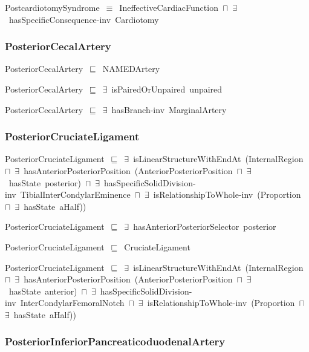 \documentclass{article}
\begin{document}
PostcardiotomySyndrome~\ensuremath{\equiv}~IneffectiveCardiacFunction~\ensuremath{\sqcap}~\ensuremath{\exists}~hasSpecificConsequence-inv~Cardiotomy

\subsubsection*{PosteriorCecalArtery}

PosteriorCecalArtery~\ensuremath{\sqsubseteq}~NAMEDArtery~

PosteriorCecalArtery~\ensuremath{\sqsubseteq}~\ensuremath{\exists}~isPairedOrUnpaired~unpaired~

PosteriorCecalArtery~\ensuremath{\sqsubseteq}~\ensuremath{\exists}~hasBranch-inv~MarginalArtery~

\subsubsection*{PosteriorCruciateLigament}

PosteriorCruciateLigament~\ensuremath{\sqsubseteq}~\ensuremath{\exists}~isLinearStructureWithEndAt~(InternalRegion~\ensuremath{\sqcap}~\ensuremath{\exists}~hasAnteriorPosteriorPosition~(AnteriorPosteriorPosition~\ensuremath{\sqcap}~\ensuremath{\exists}~hasState~posterior)~\ensuremath{\sqcap}~\ensuremath{\exists}~hasSpecificSolidDivision-inv~TibialInterCondylarEminence~\ensuremath{\sqcap}~\ensuremath{\exists}~isRelationshipToWhole-inv~(Proportion~\ensuremath{\sqcap}~\ensuremath{\exists}~hasState~aHalf))~

PosteriorCruciateLigament~\ensuremath{\sqsubseteq}~\ensuremath{\exists}~hasAnteriorPosteriorSelector~posterior~

PosteriorCruciateLigament~\ensuremath{\sqsubseteq}~CruciateLigament~

PosteriorCruciateLigament~\ensuremath{\sqsubseteq}~\ensuremath{\exists}~isLinearStructureWithEndAt~(InternalRegion~\ensuremath{\sqcap}~\ensuremath{\exists}~hasAnteriorPosteriorPosition~(AnteriorPosteriorPosition~\ensuremath{\sqcap}~\ensuremath{\exists}~hasState~anterior)~\ensuremath{\sqcap}~\ensuremath{\exists}~hasSpecificSolidDivision-inv~InterCondylarFemoralNotch~\ensuremath{\sqcap}~\ensuremath{\exists}~isRelationshipToWhole-inv~(Proportion~\ensuremath{\sqcap}~\ensuremath{\exists}~hasState~aHalf))~

\subsubsection*{PosteriorInferiorPancreaticoduodenalArtery}
\end{document}
